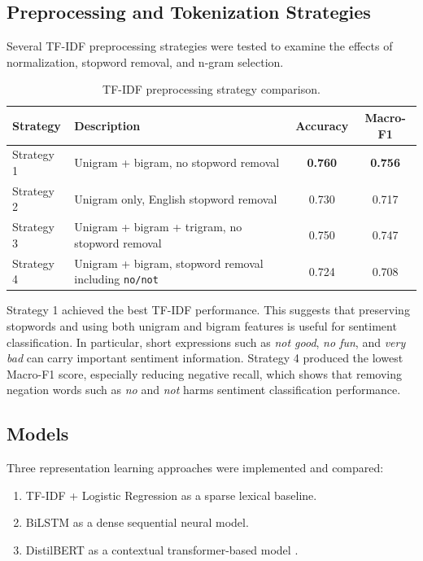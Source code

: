 \documentclass[11pt,a4paper]{article}
\begin{document}
\subsection{Preprocessing and Tokenization Strategies}

Several TF-IDF preprocessing strategies were tested to examine the effects of normalization, stopword removal, and n-gram selection.

\begin{table}[H]
\centering
\caption{TF-IDF preprocessing strategy comparison.}
\begin{tabular}{p{2.2cm}p{8cm}cc}
\toprule
Strategy & Description & Accuracy & Macro-F1 \\
\midrule
Strategy 1 & Unigram + bigram, no stopword removal & \textbf{0.760} & \textbf{0.756} \\
Strategy 2 & Unigram only, English stopword removal & 0.730 & 0.717 \\
Strategy 3 & Unigram + bigram + trigram, no stopword removal & 0.750 & 0.747 \\
Strategy 4 & Unigram + bigram, stopword removal including \texttt{no/not} & 0.724 & 0.708 \\
\bottomrule
\end{tabular}
\end{table}

Strategy 1 achieved the best TF-IDF performance. This suggests that preserving stopwords and using both unigram and bigram features is useful for sentiment classification. In particular, short expressions such as \textit{not good}, \textit{no fun}, and \textit{very bad} can carry important sentiment information. Strategy 4 produced the lowest Macro-F1 score, especially reducing negative recall, which shows that removing negation words such as \textit{no} and \textit{not} harms sentiment classification performance.

\subsection{Models}

Three representation learning approaches were implemented and compared:

\begin{enumerate}[leftmargin=*]
    \item TF-IDF + Logistic Regression as a sparse lexical baseline.
    \item BiLSTM as a dense sequential neural model.
    \item DistilBERT as a contextual transformer-based model \cite{devlin2019bert,sanh2019distilbert}.
\end{enumerate}
\end{document}
